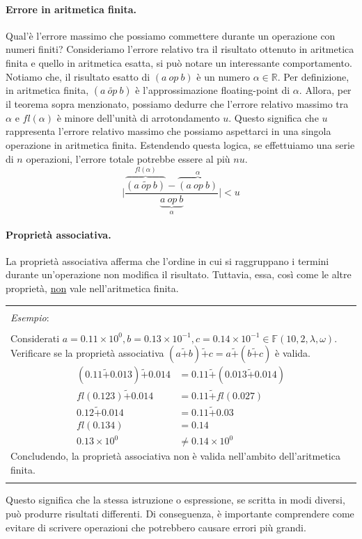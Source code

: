 \documentclass{article}
\newenvironment{example}
{\begin{center}
        \begin{tabular}{|p{0.9\textwidth}|}
            \hline \\ 
            \textit{Esempio}: \\\\ 
        }
        {
            \\\\ \hline
        \end{tabular}
    \end{center}
}
\begin{document}
\paragraph{Errore in aritmetica finita.}
Qual'è l'errore massimo che possiamo commettere durante un operazione con numeri
finiti?
Consideriamo l'errore relativo tra il risultato ottenuto in aritmetica finita
e quello in aritmetica esatta, si può notare un interessante comportamento. 
Notiamo che, il risultato esatto di $(a\ op\ b)$ è un numero $\alpha\in
\mathbb{R}$. Per definizione, in aritmetica finita, $(a\ \tilde{op}\ b)$ è
l'approssimazione floating-point di $\alpha$.
Allora, per il teorema sopra menzionato, possiamo dedurre che l'errore relativo massimo tra
$\alpha$ e $fl(\alpha)$ è minore dell'unità di arrotondamento $u$. Questo
significa che $u$ rappresenta l'errore relativo massimo che possiamo
aspettarci in una singola operazione in aritmetica finita.
Estendendo questa logica, se effettuiamo una serie di $n$ operazioni, l'errore
totale potrebbe essere al più $nu$.
$$\Big\lvert \frac{\overset{fl(\alpha)}{\overbrace{(a\ \tilde{op}\ b)}}-\overset{\alpha}{\overbrace{(a\ op\
b)}}}{\underset{\alpha}{\underbrace{a\ op\ b}}}\Big\rvert<u$$
\paragraph{Proprietà associativa.} La proprietà associativa afferma che
l'ordine in cui si raggruppano i termini durante un'operazione non modifica il
risultato. Tuttavia, essa, così come le altre proprietà, \underline{non} vale nell'aritmetica finita.
\begin{example}
    Considerati $a=0.11\times10^0,b=0.13\times10^{-1},c=0.14\times10^{-1}\in
    \mathbb{F}(10,2,\lambda,\omega)$.
    Verificare se la proprietà associativa
    $(a\tilde+b)\tilde+c=a\tilde+(b\tilde+c)$ è valida.
    \begin{equation*}
        \begin{aligned}
            (0.11\tilde+0.013)\tilde+0.014&=0.11\tilde+(0.013\tilde+0.014) \\ 
            fl(0.123)\tilde+0.014&=0.11\tilde+fl(0.027)\\ 
            0.12\tilde+0.014&=0.11\tilde+0.03 \\ 
            fl(0.134)&=0.14 \\
            0.13\times10^0&\neq0.14\times10^0
        \end{aligned} 
    \end{equation*}
    Concludendo, la proprietà associativa non è valida nell'ambito dell'aritmetica finita.
\end{example}
Questo significa che la stessa istruzione o espressione, se scritta in modi
diversi, può produrre risultati differenti. 
Di conseguenza, è importante comprendere come evitare di scrivere operazioni che
potrebbero causare errori più grandi.
\end{document}
